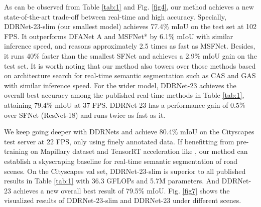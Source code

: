 \documentclass[journal]{IEEEtran}
\begin{document}
As can be observed from Table \ref{tab:1} and Fig. \ref{fig4}, our method achieves a new state-of-the-art trade-off between real-time and high accuracy. Specially, DDRNet-23-slim (our smallest model) achieves 77.4$\%$ mIoU on the test set at 102 FPS. It outperforms DFANet A and MSFNet* by 6.1$\%$ mIoU with similar inference speed, and reasons approximately 2.5 times as fast as MSFNet. Besides, it runs 40$\%$ faster than the smallest SFNet and achieves a 2.9$\%$ mIoU gain on the test set. It is worth noting that our method also towers over those methods based on architecture search for real-time semantic segmentation such as CAS\cite{zhang2019customizable} and GAS\cite{lin2020graph} with similar inference speed. For the wider model, DDRNet-23 achieves the overall best accuracy among the published real-time methods in Table \ref{tab:1}, attaining 79.4$\%$ mIoU at 37 FPS. DDRNet-23 has a performance gain of 0.5$\%$ over SFNet (ResNet-18) and runs twice as fast as it.


We keep going deeper with DDRNets and achieve 80.4$\%$ mIoU on the Cityscapes test server at 22 FPS, only using finely annotated data. If benefitting from pre-training on Mapillary\cite{neuhold2017mapillary} dataset and TensorRT acceleration like \cite{li2020semantic}, our method can establish a skyscraping baseline for real-time semantic segmentation of road scenes. On the Cityscapes val set, DDRNet-23-slim is superior to all published results in Table \ref{tab:1} with 36.3 GFLOPs and 5.7M parameters. And DDRNet-23 achieves a new overall best result of 79.5$\%$ mIoU. Fig. \ref{fig7} shows the visualized results of DDRNet-23-slim and DDRNet-23 under different scenes.
\end{document}
